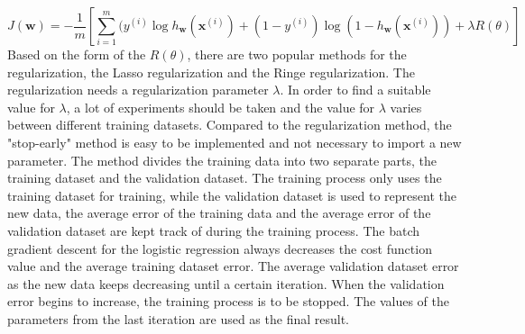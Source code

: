 \begin{equation}
J(\textbf{w})= - \frac{1}{m}[\sum_{i=1}^m (y^{(i)}\log h_\textbf{w}(\textbf{x}^{(i)}) +(1-y^{(i)})\log (1-h_\textbf{w}(\textbf{x}^{(i)}))+\lambda R(\theta)]
\end{equation} 
Based on the form of the $R(\theta)$,  there are two popular methods for the regularization, the Lasso regularization and the Ringe regularization. The regularization needs a regularization parameter $\lambda$. In order to find a suitable value for $\lambda$, a lot of experiments should be taken and the value for $\lambda$ varies between different training datasets. Compared to the regularization method, the "stop-early" method is easy to be implemented and not necessary to import a new parameter. The method divides the training data into two separate parts, the training dataset and the validation dataset. The training process only uses the training dataset for training, while the validation dataset is used to represent the new data, the average error of the training data and the average error of the validation dataset are kept track of during the training process. The batch gradient descent for the logistic regression  always decreases the cost function value and the average training dataset error. The average validation  dataset error as the new data  keeps decreasing until a certain iteration. When the validation error begins to increase, the training process is to be stopped. The values of the parameters from the last iteration are used as the final result.
 
